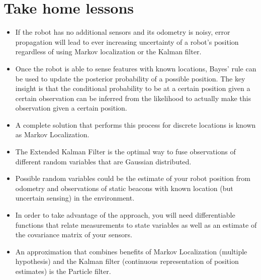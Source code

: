 \section*{Take home lessons}
\begin{itemize}
\item If the robot has no additional sensors and its odometry is noisy, error propagation will lead to ever increasing uncertainty of a robot's position regardless of using Markov localization or the Kalman filter.
\item Once the robot is able to sense features with known locations, Bayes' rule can be used to update the posterior probability of a possible position. The key insight is that the conditional probability to be at a certain position given a certain observation can be inferred from the likelihood to actually make this observation given a certain position.
\item A complete solution that performs this process for discrete locations is known as Markov Localization.
\item The Extended Kalman Filter is the optimal way to fuse observations of different random variables that are Gaussian distributed.
\item Possible random variables could be the estimate of your robot position from odometry and observations of static beacons with known location (but uncertain sensing) in the environment.
\item In order to take advantage of the approach, you will need differentiable functions that relate measurements to state variables as well as an estimate of the covariance matrix of your sensors.
\item An approximation that combines benefits of Markov Localization (multiple hypothesis) and the Kalman filter (continuous representation of position estimates) is the Particle filter.
\end{itemize}

